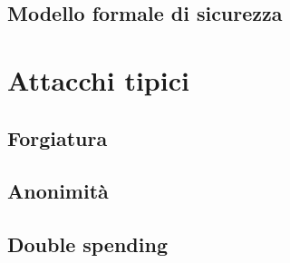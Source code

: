 \documentclass{beamer}
\begin{document}
\subsection{Modello formale di sicurezza}
	
	
	
\section{Attacchi tipici}
\subsection{Forgiatura}
	
	
\subsection{Anonimità}
	
\subsection{Double spending}
	
\end{document}
